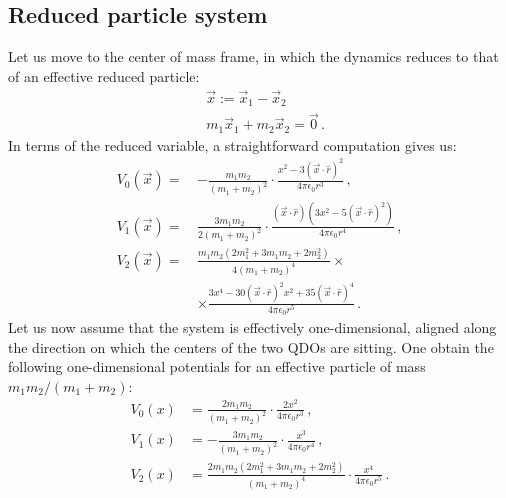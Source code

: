 \documentclass[reprint, amsmath, amssymb, aps, prl]{revtex4-2}
\begin{document}
    \subsection{Reduced particle system}

        Let us move to the center of mass frame, in which the dynamics reduces to that of an effective reduced particle:
        \begin{subequations}
        \begin{align}
            &\vec x:=\vec x_1 - \vec x_2\\
            &m_1\vec x_1 + m_2\vec x_2 = \vec 0\,.
        \end{align}
        \end{subequations}
        In terms of the reduced variable, a straightforward computation gives us:
        \begin{subequations}
        \begin{align}
            V_0(\vec x)=\,&-\frac{m_1m_2}{(m_1+m_2)^2}\cdot\frac{ x^2-3(\vec x\cdot\hat r)^2}{4\pi\epsilon_0r^3}\,,\\
            V_1(\vec x)=\,&\frac{3m_1m_2}{2(m_1+m_2)^2}\cdot\frac{(\vec x\cdot\hat r)\left(3x^2 - 5(\vec x\cdot\hat r)^2\right)}{4\pi\epsilon_0r^4}\,,\\
            V_2(\vec x)=\,&\frac{m_1m_2(2m_1^2+3m_1m_2+2m_2^2)}{4(m_1+m_2)^4}\times\\
            &\times\frac{3x^4 - 30(\vec x\cdot\hat r)^2 x^2+35(\vec x\cdot\hat r)^4}{4\pi\epsilon_0r^5}\nonumber\,.
        \end{align}
        \end{subequations}
        Let us now assume that the system is effectively one-dimensional, aligned along the direction on which the centers of the two QDOs are sitting. One obtain the following one-dimensional potentials for an effective particle of mass $m_1m_2 / (m_1+m_2)$:
        \begin{subequations}
        \begin{align}
            V_0(x)&=\frac{2m_1m_2}{(m_1+m_2)^2}\cdot\frac{2 x^2}{4\pi\epsilon_0r^3}\,,\\
            V_1(x)&=-\frac{3m_1m_2}{(m_1+m_2)^2}\cdot\frac{x^3}{4\pi\epsilon_0r^4}\,,\\
            V_2(x)&=\frac{2m_1m_2(2m_1^2+3m_1m_2+2m_2^2)}{(m_1+m_2)^4}\cdot\frac{x^4}{4\pi\epsilon_0r^5}\,.
        \end{align}
        \end{subequations}
\end{document}
